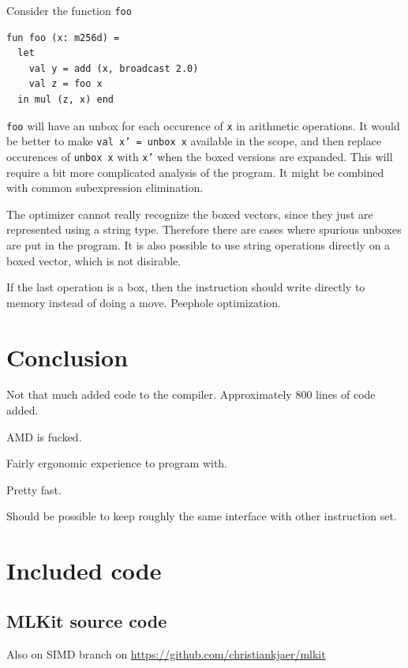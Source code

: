 \documentclass{article}
\begin{document}
Consider the function \texttt{foo}
\begin{lstlisting}
fun foo (x: m256d) =
  let
    val y = add (x, broadcast 2.0)
    val z = foo x
  in mul (z, x) end
\end{lstlisting}

\texttt{foo} will have an unbox for each occurence of \texttt{x} in arithmetic operations. It would be better to make \texttt{val x' = unbox x} available in the scope, and then replace occurences of \texttt{unbox x} with \texttt{x'} when the boxed versions are expanded. This will require a bit more complicated analysis of the program. It might be combined with common subexpression elimination.

The optimizer cannot really recognize the boxed vectors, since they just are represented using a string type. Therefore there are cases where spurious unboxes are put in the program. It is also possible to use string operations directly on a boxed vector, which is not disirable.

If the last operation is a box, then the instruction should write directly to memory instead of doing a move. Peephole optimization.

\section{Conclusion}

Not that much added code to the compiler. Approximately 800 lines of code added.

AMD is fucked.

Fairly ergonomic experience to program with.

Pretty fast.

Should be possible to keep roughly the same interface with other instruction set.






\appendix

\section{Included code}

\subsection{MLKit source code}

Also on SIMD branch on 
\url{https://github.com/christiankjaer/mlkit}
\end{document}

